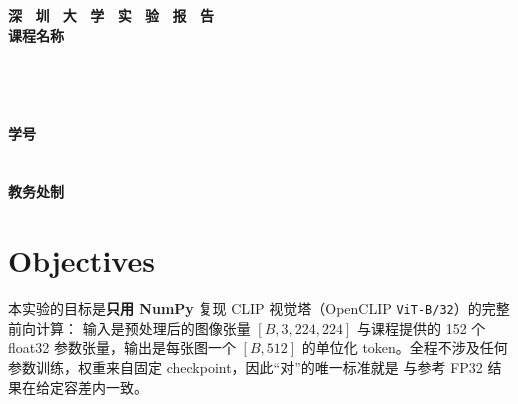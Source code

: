 \documentclass[a4paper,12pt]{article}
\begin{document}
\begin{titlepage}
    \centering
    \vspace*{2cm}
    \Huge{\textbf{深 \ 圳 \ 大 \ 学 \ 实 \ 验  \ 报 \ 告}}\\[1.5cm]

    {\Large\textbf{课程名称}\quad\underline{}}\\[0.5cm]
{\Large
\noindent{}
\underline{}}\\[0.5cm]
{\Large
\noindent{}
\underline{}}\\[0.5cm]
{\Large
\noindent{}
\underline{\makebox[8cm][c]{}}}\\[0.5cm]
{\Large
\noindent{}
\underline{}}\\[0.5cm]
{\Large
\noindent{}
\underline{\makebox[3cm][c]{}}
\hspace{0.5cm}
\textbf{学号}
\underline{\makebox[3cm][c]{}}}\\[0.5cm]
{\Large
\noindent{}
\underline{\makebox[8cm][c]{}}}\\[0.5cm]
{\Large
\noindent{}
\underline{\makebox[8cm][c]{}}}\\[1.5cm]

    \vfill
    \Large{\textbf{教务处制}}
\end{titlepage}

\newpage


\section{Objectives}

本实验的目标是\textbf{只用 NumPy} 复现 CLIP 视觉塔（OpenCLIP \texttt{ViT-B/32}）的完整前向计算：
输入是预处理后的图像张量 $[B,3,224,224]$ 与课程提供的 152 个 float32 参数张量，输出是每张图一个
$[B,512]$ 的单位化 token。全程不涉及任何参数训练，权重来自固定 checkpoint，因此“对”的唯一标准就是
与参考 FP32 结果在给定容差内一致。
\end{document}
